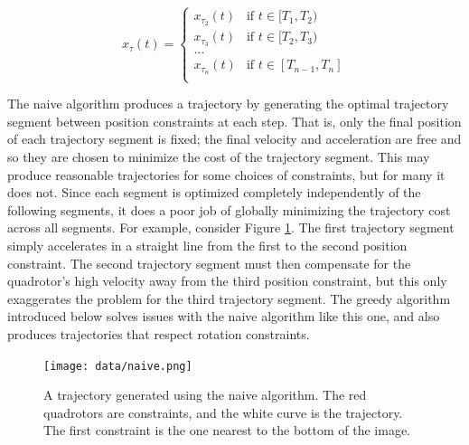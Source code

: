 \documentclass[pageno]{jpaper}
\begin{document}
\begin{equation*}
  x_{\tau}(t) = \begin{cases}
    x_{\tau_2}(t) & \text{if } t \in [T_1, T_2) \\
    x_{\tau_3}(t) & \text{if } t \in [T_2, T_3) \\
    \dots \\
    x_{\tau_n}(t) & \text{if } t \in [T_{n-1}, T_n] \\
  \end{cases}
\end{equation*}

The naive algorithm produces a trajectory by generating the optimal trajectory segment between position constraints at each step. That is, only the final position of each trajectory segment is fixed; the final velocity and acceleration are free and so they are chosen to minimize the cost of the trajectory segment. This may produce reasonable trajectories for some choices of constraints, but for many it does not. Since each segment is optimized completely independently of the following segments, it does a poor job of globally minimizing the trajectory cost across all segments. For example, consider Figure \ref{fig:naive}. The first trajectory segment simply accelerates in a straight line from the first to the second position constraint. The second trajectory segment must then compensate for the quadrotor's high velocity away from the third position constraint, but this only exaggerates the problem for the third trajectory segment. The greedy algorithm introduced below solves issues with the naive algorithm like this one, and also produces trajectories that respect rotation constraints.

\begin{figure}[hbt]
  \texttt{[image: data/naive.png]}
  \caption{A trajectory generated using the naive algorithm. The red quadrotors are constraints, and the white curve is the trajectory. The first constraint is the one nearest to the bottom of the image.}
  \label{fig:naive}
\end{figure}
\end{document}
